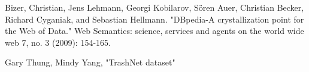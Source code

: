 
\begin{thebibliography}{99}

 Bizer, Christian, Jens Lehmann, Georgi Kobilarov, Sören Auer, Christian Becker, Richard Cyganiak, and Sebastian Hellmann. "DBpedia-A crystallization point for the Web of Data." Web Semantics: science, services and agents on the world wide web 7, no. 3 (2009): 154-165.

 Gary Thung, Mindy Yang, "TrashNet dataset"


\end{thebibliography}